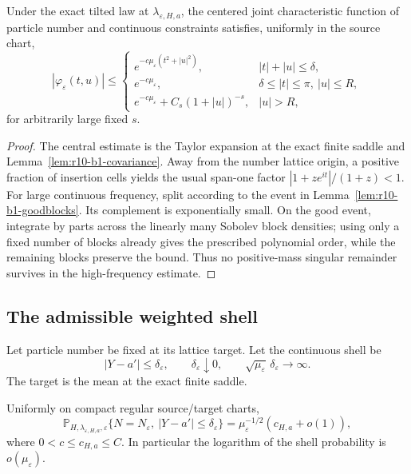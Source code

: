 \begin{theorem}
\label{thm:r10-b1-characteristic}
Under the exact tilted law at
\(\lambda_{\varepsilon,H,a}\), the centered joint characteristic function of
particle number and continuous constraints satisfies, uniformly in the source
chart,
\[
 |\varphi_\varepsilon(t,u)|\le
 \begin{cases}
 e^{-c\mu_\varepsilon(t^2+|u|^2)},&|t|+|u|\le\delta,\\
 e^{-c\mu_\varepsilon},&\delta\le |t|\le\pi,
                            \ |u|\le R,\\
 e^{-c\mu_\varepsilon}+C_s(1+|u|)^{-s},&|u|>R,
 \end{cases}
\]
for arbitrarily large fixed \(s\).
\end{theorem}

\begin{proof}
The central estimate is the Taylor expansion at the exact finite saddle and
Lemma~\ref{lem:r10-b1-covariance}.  Away from the number lattice origin, a
positive fraction of insertion cells yields the usual span-one factor
\(|1+ze^{it}|/(1+z)<1\).  For large continuous frequency, split according to
the event in Lemma~\ref{lem:r10-b1-goodblocks}.  Its complement is
exponentially small.  On the good event, integrate by parts across the
linearly many Sobolev block densities; using only a fixed number of blocks
already gives the prescribed polynomial order, while the remaining blocks
preserve the bound.  Thus no positive-mass singular remainder survives in the
high-frequency estimate.
\end{proof}

\subsection{The admissible weighted shell}

Let particle number be fixed at its lattice target.  Let the continuous shell
be
\[
 |Y-a'|\le\delta_\varepsilon,
 \qquad
 \delta_\varepsilon\downarrow0,
 \qquad
 \sqrt{\mu_\varepsilon}\,\delta_\varepsilon\longrightarrow\infty.
\]
The target is the mean at the exact finite saddle.

\begin{theorem}
\label{thm:r10-b1-shell}
Uniformly on compact regular source/target charts,
\[
 \mathbb P_{H,\lambda_{\varepsilon,H,a},\varepsilon}
 \{N=N_\varepsilon,\ |Y-a'|\le\delta_\varepsilon\}
 =\mu_\varepsilon^{-1/2}(c_{H,a}+o(1)),
\]
where \(0<c\le c_{H,a}\le C\).  In particular the logarithm of the shell
probability is \(o(\mu_\varepsilon)\).
\end{theorem}

